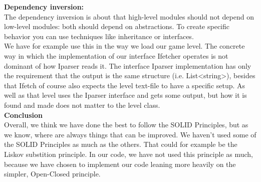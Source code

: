 \documentclass[../master.tex]{subfile}
\begin{document}
\noindent\textbf{Dependency inversion:}\\
The dependency inversion is about that high-level modules should not depend on low-level modules: both should depend on abstractions. To create specific behavior you can use techniques like inheritance or interfaces.\\

\noindent We have for example use this in the way we load our game level. The concrete way in which the implementation of our interface Ifetcher operates is not dominant of how Iparser reads it. The interface Iparser implementation has only the requirement that the output is the same structure (i.e. List<string>), besides that Ifetch of course also expects the level text-file to have a specific setup. As well as that level uses the Iparser interface and gets some output, but how it is found and made does not matter to the level class.\\

\noindent\textbf{Conclusion}\\
Overall, we think we have done the best to follow the SOLID Principles, but as we know, where are always things that can be improved. We haven't used some of the SOLID Principles as much as the others. That could for example be the Liskov substition principle. In our code, we have not used this principle as much, because we have chosen to implement our code leaning more heavily on the simpler, Open-Closed principle.
\end{document}
